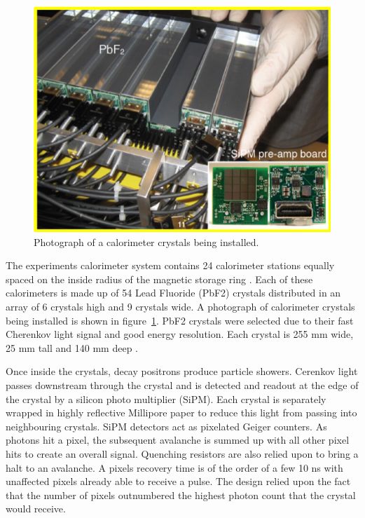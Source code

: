 \begin{figure}[th]
\centering
\includegraphics[scale=1.4]{Figures/calorimeterphoto}
\decoRule
\caption{Photograph of a calorimeter crystals being installed.}
\label{fig:calorimeterphoto}
\end{figure}

The experiments calorimeter system contains 24 calorimeter stations equally spaced on the inside radius of the magnetic storage ring \cite{Reference24}. Each of these calorimeters is made up of 54 Lead Fluoride (PbF2) crystals distributed in an array of 6 crystals high and 9 crystals wide. A photograph of calorimeter crystals being installed is shown in figure~\ref{fig:calorimeterphoto}. PbF2 crystals were selected due to their fast Cherenkov light signal and good energy resolution. Each crystal is 255 mm wide, 25 mm tall and 140 mm deep \cite{calref1}.

Once inside the crystals, decay positrons produce particle showers. Cerenkov light passes downstream through the crystal and is detected and readout at the edge of the crystal by a silicon photo multiplier (SiPM). Each crystal is separately wrapped in highly reflective Millipore paper to reduce this light from passing into neighbouring crystals. SiPM detectors act as pixelated Geiger counters. As photons hit a pixel, the subsequent avalanche is summed up with all other pixel hits to create an overall signal. Quenching resistors are also relied upon to bring a halt to an avalanche. A pixels recovery time is of the order of a few 10 ns with unaffected pixels already able to receive a pulse. The design relied upon the fact that the number of pixels outnumbered the highest photon count that the crystal would receive.

